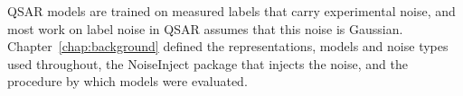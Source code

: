 
QSAR models are trained on measured labels that carry experimental noise, and most work on label noise in QSAR assumes that this noise is Gaussian. Chapter~\ref{chap:background} defined the representations, models and noise types used throughout, the NoiseInject package that injects the noise, and the procedure by which models were evaluated.

